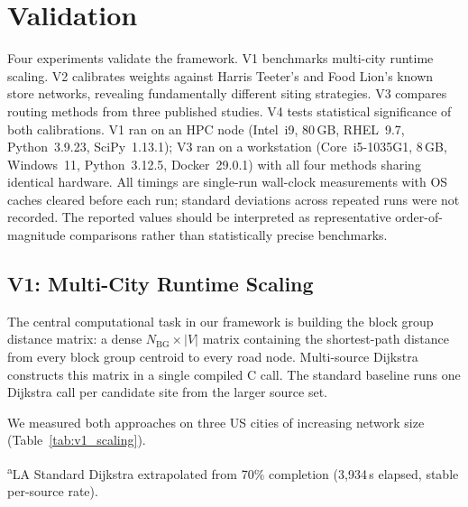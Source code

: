 \documentclass[conference]{IEEEtran}
\begin{document}
\section{Validation}
\label{sec:validation}

Four experiments validate the framework. V1 benchmarks multi-city
runtime scaling. V2 calibrates weights against Harris Teeter's and
Food Lion's known store networks, revealing fundamentally different
siting strategies. V3 compares routing methods from three published
studies. V4 tests statistical significance of both calibrations.
V1 ran on an HPC node (Intel~i9, 80\,GB, RHEL~9.7, Python~3.9.23,
SciPy~1.13.1); V3 ran on a workstation (Core~i5-1035G1, 8\,GB,
Windows~11, Python~3.12.5, Docker~29.0.1) with all four methods
sharing identical hardware. All timings are single-run wall-clock
measurements with OS caches cleared before each run; standard
deviations across repeated runs were not recorded. The reported values
should be interpreted as representative order-of-magnitude comparisons
rather than statistically precise benchmarks.

\subsection{V1: Multi-City Runtime Scaling}
\label{sec:v1}

The central computational task in our framework is building the block
group distance matrix: a dense $N_{\text{BG}} \times |V|$ matrix
containing the shortest-path distance from every block group centroid
to every road node. Multi-source Dijkstra constructs this matrix in
a single compiled C call. The standard baseline runs one Dijkstra
call per candidate site from the larger source set.

We measured both approaches on three US cities of increasing network
size (Table~\ref{tab:v1_scaling}).

\begin{table}[!t]
\centering
\caption{V1: Multi-City Runtime Scaling \& Speedup (HPC, 80\,GB RAM)}
\label{tab:v1_scaling}
\vspace{2pt}
\footnotesize\textsuperscript{a}LA Standard Dijkstra extrapolated from 70\% completion
(3{,}934\,s elapsed, stable per-source rate).
\end{table}
\end{document}
